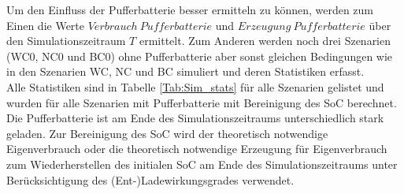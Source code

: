         Um den Einfluss der Pufferbatterie besser ermitteln zu können, werden zum Einen die Werte $Verbrauch~Pufferbatterie$ und $Erzeugung~Pufferbatterie$ über den Simulationszeitraum $T$ ermittelt. Zum Anderen werden noch drei Szenarien (WC0, NC0 und BC0) ohne Pufferbatterie aber sonst gleichen Bedingungen wie in den Szenarien WC, NC und BC simuliert und deren Statistiken erfasst. \\
        
        Alle Statistiken sind in Tabelle \ref{Tab:Sim_stats} für alle Szenarien gelistet und wurden für alle Szenarien mit Pufferbatterie mit Bereinigung des SoC berechnet. Die Pufferbatterie ist am Ende des Simulationszeitraums unterschiedlich stark geladen. Zur Bereinigung des SoC wird der theoretisch notwendige Eigenverbrauch oder die theoretisch notwendige Erzeugung für Eigenverbrauch zum Wiederherstellen des initialen SoC am Ende des Simulationszeitraums unter Berücksichtigung des (Ent-)Ladewirkungsgrades verwendet. 

